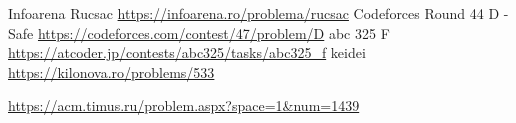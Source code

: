 \documentclass[10pt]{beamer}
\begin{document}
\begin{frame}[allowframebreaks]

\begin{thebibliography}{9}


Infoarena Rucsac \url{https://infoarena.ro/problema/rucsac}
Codeforces Round 44 D - Safe \url{https://codeforces.com/contest/47/problem/D}
abc 325 F \url{https://atcoder.jp/contests/abc325/tasks/abc325_f}
keidei \url{https://kilonova.ro/problems/533}


\url{https://acm.timus.ru/problem.aspx?space=1&num=1439} %

\end{thebibliography}

\end{frame}


\end{document}
